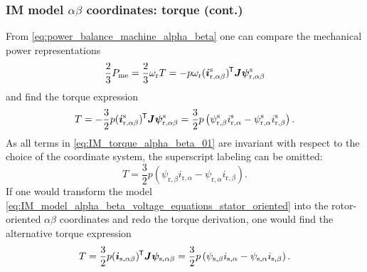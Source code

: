 \begin{frame}
	\frametitle{IM model $\alpha\beta$ coordinates: torque (cont.)}
    From \eqref{eq:power_balance_machine_alpha_beta} one can compare the mechanical power representations
    \begin{equation}
        \frac{2}{3}P_\mathrm{me} = \frac{2}{3} \omega_\mathrm{r} T = -p\omega_\mathrm{r}(\bm{i}^\mathrm{s}_\mathrm{r,\alpha\beta})^{\mkern-1.5mu\mathsf{T}}\bm{J}\bm{\psi}^\mathrm{s}_\mathrm{r,\alpha\beta}
    \end{equation}
    \pause
    and find the torque expression
    \begin{equation}
        T = -\frac{3}{2} p (\bm{i}^\mathrm{s}_\mathrm{r,\alpha\beta})^{\mkern-1.5mu\mathsf{T}}\bm{J}\bm{\psi}^\mathrm{s}_\mathrm{r,\alpha\beta} = \frac{3}{2} p \left(\psi_{\mathrm{r},\beta}^\mathrm{s} i_{\mathrm{r},\alpha}^\mathrm{s} - \psi_{\mathrm{r},\alpha}^\mathrm{s}i_{\mathrm{r},\beta}^\mathrm{s}\right).
        \label{eq:IM_torque_alpha_beta_01}
    \end{equation}
    \pause
    As all terms in \eqref{eq:IM_torque_alpha_beta_01} are invariant with respect to the choice of the coordinate system, the superscript labeling can be omitted:
    \begin{equation}
        T = \frac{3}{2} p \left(\psi_{\mathrm{r},\beta} i_{\mathrm{r},\alpha} - \psi_{\mathrm{r},\alpha}i_{\mathrm{r},\beta}\right).
        \label{eq:IM_torque_alpha_beta_02}
    \end{equation}
    \pause
    If one would transform the model \eqref{eq:IM_model_alpha_beta_voltage_equations_stator_oriented} into the rotor-oriented $\alpha\beta$ coordinates and redo the torque derivation, one would find the alternative torque expression
    \begin{equation}
        T = \frac{3}{2} p (\bm{i}_\mathrm{s,\alpha\beta})^{\mkern-1.5mu\mathsf{T}}\bm{J}\bm{\psi}_\mathrm{s,\alpha\beta} = \frac{3}{2} p \left(\psi_{\mathrm{s},\beta} i_{\mathrm{s},\alpha} - \psi_{\mathrm{s},\alpha}i_{\mathrm{s},\beta}\right).
    \end{equation}
\end{frame}

